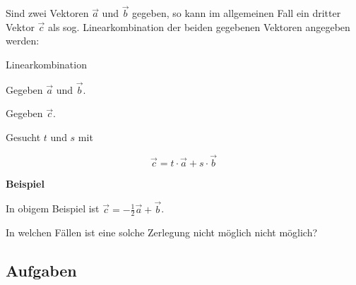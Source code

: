 Sind zwei Vektoren $\vec{a}$ und $\vec{b}$ gegeben, so kann im
allgemeinen Fall ein
dritter Vektor $\vec{c}$ als sog. Linearkombination der beiden
gegebenen Vektoren angegeben werden:

\begin{gesetz}{Linearkombination}{}

  Gegeben $\vec{a}$ und $\vec{b}$.

  Gegeben $\vec{c}$.

  Gesucht $t$ und $s$ mit

  $$\vec{c} = t\cdot{}\vec{a} + s\cdot{}\vec{b}$$
\end{gesetz}

\textbf{Beispiel}


In obigem Beispiel ist $\vec{c} = -\frac12 \vec{a} + \vec{b}$.

In welchen Fällen ist eine solche Zerlegung nicht möglich nicht möglich?

\subsection*{Aufgaben}


